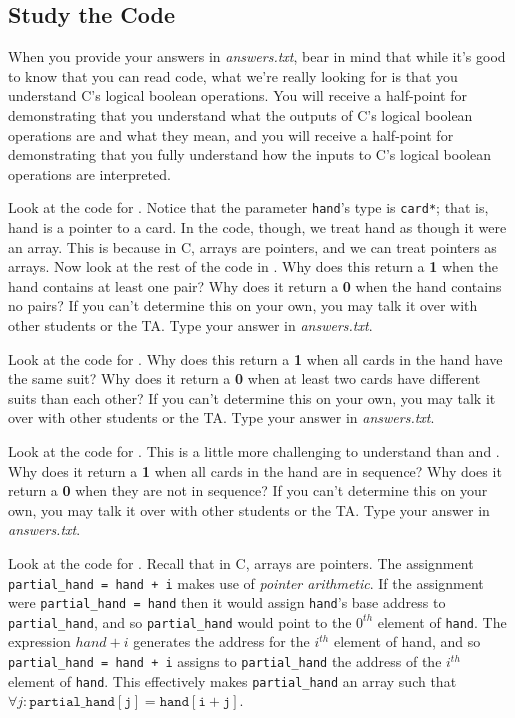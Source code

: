 \subsection{Study the Code} \label{subsec:studythecode}

When you provide your answers in \textit{answers.txt}, bear in mind that while it's good to know that you can read code, what we're really looking for is that you understand C's logical boolean operations.
You will receive a half-point for demonstrating that you understand what the outputs of C's logical boolean operations are and what they mean,
and you will receive a half-point for demonstrating that you fully understand how the inputs to C's logical boolean operations are interpreted.

Look at the code for .
Notice that the parameter \lstinline{hand}'s type is \lstinline{card*}; that is, \lstinline{}{hand} is a pointer to a \lstinline{}{card}.
In the code, though, we treat \lstinline{}{hand} as though it were an array.
This is because in C, arrays are pointers, and we can treat pointers as arrays.
Now look at the rest of the code in .
Why does this return a \textbf{1} when the hand contains at least one pair?
Why does it return a \textbf{0} when the hand contains no pairs?
If you can't determine this on your own, you may talk it over with other students or the TA.
Type your answer in \textit{answers.txt}.

Look at the code for .
Why does this return a \textbf{1} when all cards in the hand have the same suit?
Why does it return a \textbf{0} when at least two cards have different suits than each other?
If you can't determine this on your own, you may talk it over with other students or the TA.
Type your answer in \textit{answers.txt}.

Look at the code for .
This is a little more challenging to understand than  and .
Why does it return a \textbf{1} when all cards in the hand are in sequence?
Why does it return a \textbf{0} when they are not in sequence?
If you can't determine this on your own, you may talk it over with other students or the TA.
Type your answer in \textit{answers.txt}.

Look at the code for .
Recall that in C, arrays are pointers.
The assignment \lstinline{partial_hand = hand + i} makes use of \textit{pointer arithmetic}.
If the assignment were \lstinline{partial_hand = hand} then it would assign \lstinline{hand}'s base address to \lstinline{partial_hand}, and so \lstinline{partial_hand} would point to the $0^{th}$ element of \lstinline{hand}.
The expression $hand+i$ generates the address for the $i^{th}$ element of \lstinline{}{hand}, and so \lstinline{partial_hand = hand + i} assigns to \lstinline{partial_hand} the address of the $i^{th}$ element of \lstinline{hand}.
This effectively makes \lstinline{partial_hand} an array such that $\forall j : \mathtt{partial\_hand[j] = hand[i+j]}$.


